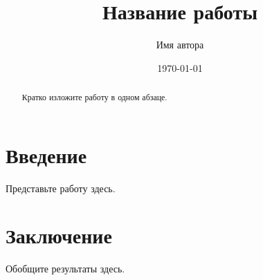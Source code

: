 \documentclass[12pt]{report}
\title{Название работы}
\author{Имя автора}
\date{\today}
\begin{document}
\maketitle

\begin{abstract}
Кратко изложите работу в одном абзаце.
\end{abstract}

\tableofcontents

\chapter{Введение}
Представьте работу здесь.

\chapter{Заключение}
Обобщите результаты здесь.
\end{document}
